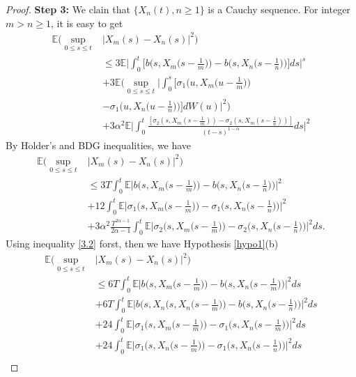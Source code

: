 \documentclass[a4 paper, 12pt]{report}
\theoremstyle{plain}
\begin{document}
\begin{proof}
\textbf{Step 3:} We clain that $\{X_n(t), n\geq 1\}$ is a Cauchy sequence. For integer $m>n\geq 1$, it is easy to get
\begin{align*}
\mathbb{E}\bigg(\sup_{0\leq s\leq t}&|X_m(s) - X_n(s)|^2\bigg)\\
&\leq 3\mathbb{E}\bigg|\int_0^t\bigg[b\bigg(s,X_m\bigg(s-\frac{1}{m}\bigg)\bigg) - b\bigg(s,X_n\bigg(s-\frac{1}{n}\bigg)\bigg)\bigg]ds\bigg|^s\\
&+3\mathbb{E}\bigg(\sup_{0\leq s\leq t}\bigg|\int_0^s\bigg[\sigma_1\bigg(u,X_m\bigg(u - \frac{1}{m}\bigg)\bigg)\\
& - \sigma_1\bigg(u,X_n\bigg(u - \frac{1}{n}\bigg)\bigg)\bigg]dW(u)\bigg|^2\bigg)\\
&+3\alpha^2\mathbb{E}\bigg|\int_0^t\frac{[\sigma_2(s,X_m(s - \frac{1}{m})) - \sigma_2(s,X_m(s-\frac{1}{n}))]}{(t-s)^{1-\alpha}}ds\bigg|^2
\end{align*} 
By H$\ddot{\mbox{o}}$lder's and BDG inequalities, we have
\begin{align*}
\mathbb{E}\bigg(\sup_{0\leq s\leq t}&|X_m(s) - X_n(s)|^2\bigg)\\
&\leq 3T\int_0^t\mathbb{E}\bigg|b\bigg(s,X_m\bigg(s-\frac{1}{m}\bigg)\bigg) - b\bigg(s,X_n\bigg(s-\frac{1}{n}\bigg)\bigg)\bigg|^2\\
&+12\int_0^t\mathbb{E}\bigg|\sigma_1\bigg(s,X_m\bigg(s - \frac{1}{m}\bigg)\bigg) - \sigma_1\bigg(s,X_n\bigg(s-\frac{1}{n}\bigg)\bigg)\bigg|^2\\
&+3\alpha^2\frac{T^{2\alpha-1}}{2\alpha - 1}\int_0^t\mathbb{E}\bigg|\sigma_2\bigg(s,X_m\bigg(s - \frac{1}{m}\bigg)\bigg) - \sigma_2\bigg(s,X_n\bigg(s-\frac{1}{n}\bigg)\bigg)\bigg|^2ds.
\end{align*}
Using inequality \eqref{3.2} forst, then we have Hypothesis \ref{hypo1}(b)
\begin{align*}
\mathbb{E}\bigg(\sup_{0\leq s\leq t}&|X_m(s) - X_n(s)|^2\bigg)\\
&\leq 6T\int_0^t\mathbb{E}\bigg|b\bigg(s,X_m\bigg(s-\frac{1}{m}\bigg)\bigg) - b\bigg(s,X_n\bigg(s-\frac{1}{m}\bigg)\bigg)\bigg|^2ds\\
&+6T\int_0^t\mathbb{E}\bigg|b\bigg(s,X_n\bigg(s,X_n\bigg(s-\frac{1}{m}\bigg)\bigg) - b\bigg(s,X_n\bigg(s-\frac{1}{n}\bigg)\bigg)\bigg|^2ds\\
&+24\int_0^t\mathbb{E}\bigg|\sigma_1\bigg(s,X_m\bigg(s-\frac{1}{m}\bigg)\bigg) - \sigma_1\bigg(s,X_n\bigg(s-\frac{1}{m}\bigg)\bigg)\bigg|^2ds\\
&+24\int_0^t\mathbb{E}\bigg|\sigma_1\bigg(s,X_n\bigg(s-\frac{1}{m}\bigg)\bigg) - \sigma_1\bigg(s,X_n\bigg(s-\frac{1}{n}\bigg)\bigg)\bigg|^2ds\\

\end{align*}
\end{proof}
\end{document}

